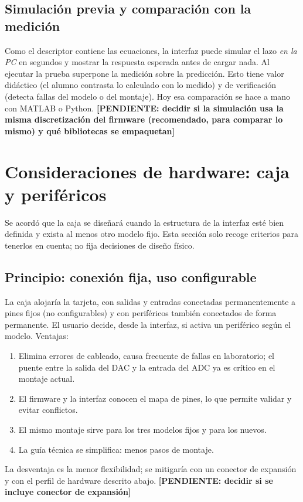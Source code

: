 \documentclass[12pt,letterpaper]{article}
\newcommand{\pendiente}[1]{\textbf{[PENDIENTE: #1]}}
\begin{document}
\subsection{Simulación previa y comparación con la medición}

Como el descriptor contiene las ecuaciones, la interfaz puede simular el lazo \emph{en la PC} en segundos y mostrar la respuesta esperada antes de cargar nada. Al ejecutar la prueba superpone la medición sobre la predicción. Esto tiene valor didáctico (el alumno contrasta lo calculado con lo medido) y de verificación (detecta fallas del modelo o del montaje). Hoy esa comparación se hace a mano con MATLAB o Python. \pendiente{decidir si la simulación usa la misma discretización del firmware (recomendado, para comparar lo mismo) y qué bibliotecas se empaquetan}

\section{Consideraciones de hardware: caja y periféricos}
\label{sec:hw}

Se acordó que la caja se diseñará cuando la estructura de la interfaz esté bien definida y exista al menos otro modelo fijo. Esta sección solo recoge criterios para tenerlos en cuenta; no fija decisiones de diseño físico.

\subsection{Principio: conexión fija, uso configurable}

La caja alojaría la tarjeta, con salidas y entradas conectadas permanentemente a pines fijos (no configurables) y con periféricos también conectados de forma permanente. El usuario decide, desde la interfaz, si activa un periférico según el modelo. Ventajas:
\begin{enumerate}
    \item Elimina errores de cableado, causa frecuente de fallas en laboratorio; el puente entre la salida del DAC y la entrada del ADC ya es crítico en el montaje actual.
    \item El firmware y la interfaz conocen el mapa de pines, lo que permite validar y evitar conflictos.
    \item El mismo montaje sirve para los tres modelos fijos y para los nuevos.
    \item La guía técnica se simplifica: menos pasos de montaje.
\end{enumerate}
La desventaja es la menor flexibilidad; se mitigaría con un conector de expansión y con el perfil de hardware descrito abajo. \pendiente{decidir si se incluye conector de expansión}
\end{document}
